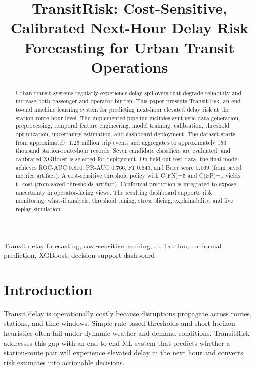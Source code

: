 \documentclass[conference]{IEEEtran}
\begin{document}
\title{TransitRisk: Cost-Sensitive, Calibrated Next-Hour Delay Risk Forecasting for Urban Transit Operations}

\author{
}

\maketitle

\begin{abstract}
Urban transit systems regularly experience delay spillovers that degrade reliability and increase both passenger and operator burden. This paper presents TransitRisk, an end-to-end machine learning system for predicting next-hour elevated delay risk at the station-route-hour level. The implemented pipeline includes synthetic data generation, preprocessing, temporal feature engineering, model training, calibration, threshold optimization, uncertainty estimation, and dashboard deployment. The dataset starts from approximately 1.25 million trip events and aggregates to approximately 153 thousand station-route-hour records. Seven candidate classifiers are evaluated, and calibrated XGBoost is selected for deployment. On held-out test data, the final model achieves ROC-AUC 0.810, PR-AUC 0.766, F1 0.643, and Brier score 0.169 (from saved metrics artifact). A cost-sensitive threshold policy with C(FN)=5 and C(FP)=1 yields t\_cost  (from saved thresholds artifact). Conformal prediction is integrated to expose uncertainty in operator-facing views. The resulting dashboard supports risk monitoring, what-if analysis, threshold tuning, stress slicing, explainability, and live replay simulation.
\end{abstract}

\begin{IEEEkeywords}
Transit delay forecasting, cost-sensitive learning, calibration, conformal prediction, XGBoost, decision support dashboard
\end{IEEEkeywords}

\section{Introduction}
Transit delay is operationally costly because disruptions propagate across routes, stations, and time windows. Simple rule-based thresholds and short-horizon heuristics often fail under dynamic weather and demand conditions. TransitRisk addresses this gap with an end-to-end ML system that predicts whether a station-route pair will experience elevated delay in the next hour and converts risk estimates into actionable decisions.
\end{document}
